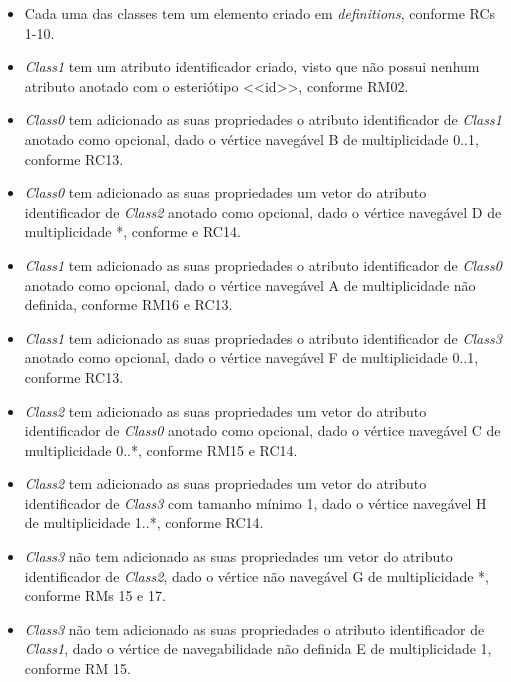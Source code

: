 \begin{itemize}
    \item Cada uma das classes tem um elemento criado em \textit{definitions}, conforme RCs 1-10.

    \item \textit{Class1} tem um atributo identificador criado, visto que não possui nenhum atributo anotado com o esteriótipo <<id>>, conforme RM02.

    \item \textit{Class0} tem adicionado as suas propriedades o atributo identificador de \textit{Class1} anotado como opcional, dado o vértice navegável B de multiplicidade 0..1, conforme RC13.

    \item \textit{Class0} tem adicionado as suas propriedades um vetor do atributo identificador de \textit{Class2} anotado como opcional, dado o vértice navegável D de multiplicidade *, conforme e RC14.

    \item \textit{Class1} tem adicionado as suas propriedades o atributo identificador de \textit{Class0} anotado como opcional, dado o vértice navegável A de multiplicidade não definida, conforme RM16 e RC13.

    \item \textit{Class1} tem adicionado as suas propriedades o atributo identificador de \textit{Class3} anotado como opcional, dado o vértice navegável F de multiplicidade 0..1, conforme RC13.

    \item \textit{Class2} tem adicionado as suas propriedades um vetor do atributo identificador de \textit{Class0} anotado como opcional, dado o vértice navegável C de multiplicidade 0..*, conforme RM15 e RC14.

    \item \textit{Class2} tem adicionado as suas propriedades um vetor do atributo identificador de \textit{Class3} com tamanho mínimo 1, dado o vértice navegável H de multiplicidade 1..*, conforme RC14.

    \item \textit{Class3} não tem adicionado as suas propriedades um vetor do atributo identificador de \textit{Class2}, dado o vértice não navegável G de multiplicidade *, conforme RMs 15 e 17.

    \item \textit{Class3} não tem adicionado as suas propriedades o atributo identificador de \textit{Class1}, dado o vértice de navegabilidade não definida E de multiplicidade 1, conforme RM 15.
\end{itemize}

